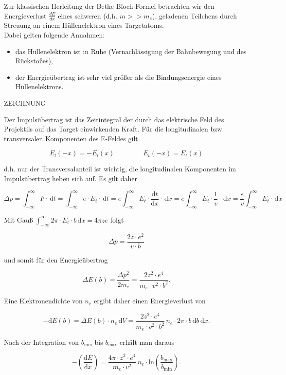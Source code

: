 \FloatBarrier
Zur klassischen Herleitung der Bethe-Bloch-Formel betrachten wir den Energieverlust
$\frac{dE}{dx}$ eines schweren (d.h. $m>>m_e$), geladenen Teilchens durch Streuung an einem Hüllenelektron eines
Targetatoms.
\\
Dabei gelten folgende Annahmen:
\begin{itemize}
  \item das Hüllenelektron ist in Ruhe (Vernachlässigung der Bahnbewegung und des Rückstoßes),
  \item der Energieübertrag ist sehr viel größer als die Bindungsenergie eines Hüllenelektrons.
\end{itemize}


{\Huge ZEICHNUNG}

Der Impulsübertrag ist das Zeitintegral der durch das elektrische Feld des Projektils auf das
Target einwirkenden Kraft. Für die longitudinalen bzw. transversalen Komponenten des E-Feldes gilt

\[E_l(-x)=-E_l(x)~~~~~~~~~~~~~~~~~~~E_t(-x)=E_t(x)\]

d.h. nur der Transversalanteil ist wichtig, die longitudinalen Komponenten im Impulsübertrag heben
sich auf. Es gilt daher

\[\Delta p= \int_{-\infty}^{\infty}F\cdot\, \mathrm{d}t = \int_{-\infty}^{\infty}e\cdot E_t\cdot\,
\mathrm{d}t = e\int_{-\infty}^{\infty}E_t\cdot\frac{\mathrm{d}t}{\mathrm{d}x}\cdot\, \mathrm{d}x
=e\int_{-\infty}^{\infty}E_t\cdot\frac{1}{v}\cdot\, \mathrm{d}x
=\frac{e}{v}\int_{-\infty}^{\infty}E_t\cdot\, \mathrm{d}x\]

Mit Gauß $\int_{-\infty}^{\infty}2\pi\cdot E_t\cdot b\,\mathrm{d}x=4\pi ze$ folgt

\[\Delta p = \frac{2z\cdot e^2}{v\cdot b}\]

und somit für den Energieübertrag

\[\Delta E(b)=\frac{\Delta p^2}{2m_e}=\frac{2z^2\cdot e^4}{m_e\cdot v^2 \cdot b^2} .\]

Eine Elektronendichte von $n_e$ ergibt daher einen Energieverlust von 

\[-\mathrm{d}E(b)=\Delta E(b)\cdot n_e\,\mathrm{d}V=\frac{2z^2\cdot e^4}{m_e\cdot v^2\cdot
b^2}\, n_e\cdot 2\pi\cdot b\, \mathrm{d}b\, \mathrm{d}x.\]

Nach der Integration von $b_{\text{min}}$ bis $b_{\text{max}}$ erhält man daraus

\[-\left(\frac{\mathrm{d}E}{\mathrm{d}x}\right)=\frac{4\pi\cdot z^2\cdot 
e^4}{m_e\cdot v^2}\,n_e\cdot\text{ln}\left(\frac{b_{\text{max}}}{b_{\text{min}}}\right).\]

